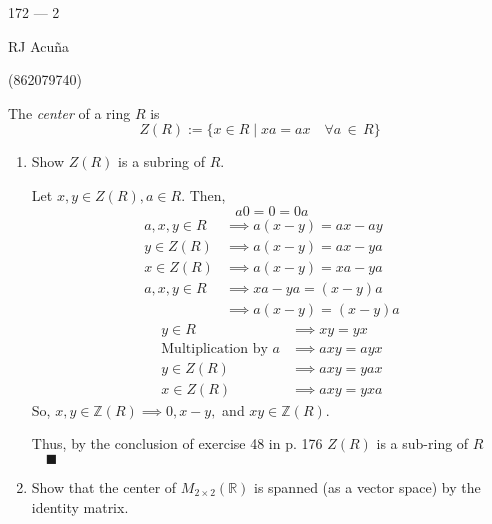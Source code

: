 \documentclass{article}
\newcommand\Z{\mathbb{Z}}
\newcommand\R{\mathbb{R}}
\begin{document}
\begin{center}
  172 --- 2

  RJ Acuña

  (862079740)
\end{center}\vspace{1.618em}


The \emph{center} of a ring $R$ is
\[ Z(R) := \{x \in R \mid xa=ax \quad \forall a \,\in\, R\}
\]
\begin{enumerate}
\item Show $Z(R)$ is a subring of $R$.


  Let $x,y \in Z(R), a \in R$. Then,
  \[a0=0=0a\]
  \begin{align*}
    a,x,y \in R &\implies a(x-y) = ax-ay\\
    y\in Z(R) &\implies a(x-y) = ax-ya\\
    x\in Z(R) &\implies a(x-y) = xa-ya\\
    a,x,y \in R &\implies xa-ya = (x-y)a\\
    &\implies a(x-y) = (x-y)a
  \end{align*}
  \begin{align*}
    y\in R &\implies xy = yx\\
    \text{Multiplication by } a &\implies axy = ayx\\
    y\in Z(R) &\implies axy = yax\\
    x\in Z(R) &\implies axy = yxa
  \end{align*}
    So, $x,y\in \Z(R) \implies  0, x-y,$ and $ xy \in \Z(R)$.

  Thus, by the conclusion of exercise 48  in p. 176
  $Z(R)$ is a sub-ring of $R$ $\quad \blacksquare$

\item Show that the center of $M_{2\times 2}(\R)$ is spanned (as a vector space) by the identity matrix.



\end{enumerate}
\end{document}
